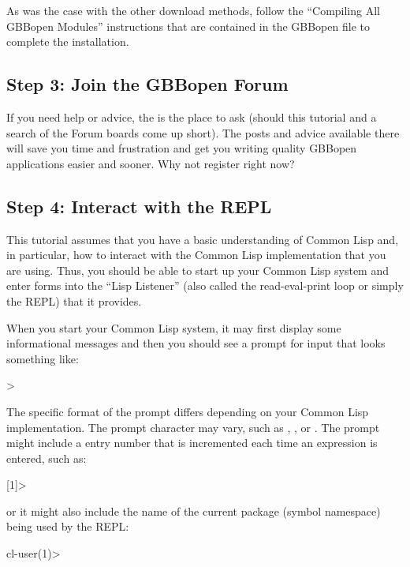 \documentclass[10pt,twoside,english,pdftex]{article}
\begin{document}
As was the case with the other download methods, follow the ``Compiling
All GBBopen Modules'' instructions that are contained in the GBBopen
 file to complete the installation.

\subsection*{Step 3: Join the GBBopen Forum}

%
If you need help or advice, the  is the place to ask (should this tutorial
and a search of the Forum boards come up short).  The posts and advice
available there will save you time and frustration and get you writing quality
GBBopen applications easier and sooner.  Why not register right now?

\subsection*{Step 4: Interact with the REPL}

%
%
This tutorial assumes that you have a basic understanding of Common Lisp and,
in particular, how to interact with the Common Lisp implementation that you
are using.  Thus, you should be able to start up your Common Lisp system and
enter forms into the ``Lisp Listener'' (also called the read-eval-print loop
or simply the REPL) that it provides.  

When you start your Common Lisp system, it may first display some informational
messages and then you should see a prompt for input that looks something like:
%
\W\supp
\begin{example}
\textcolor{darkergray}{%
  >}
\end{example}
%
The specific format of the prompt differs depending on your Common Lisp
implementation.  The prompt character may vary, such as \code{*}, \code{:}, or
.  The prompt might include a entry number that is incremented each
time an expression is entered, such as:
%
\W\supp\notpretop
\begin{example}
\textcolor{darkergray}{%
  [1]>}
\end{example}
%
or it might also include the name of the current package (symbol namespace)
being used by the REPL:
%
\W\supp\notpretop
\begin{example}
\textcolor{darkergray}{%
  cl-user(1)>}
\end{example}
\end{document}
